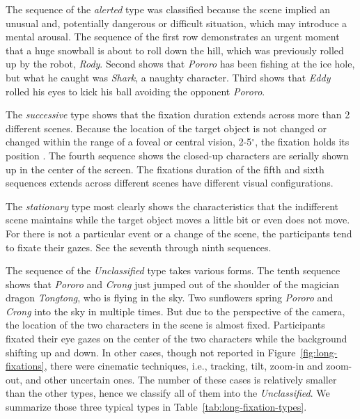 \documentclass[oneside,master]{snueethesis}
\begin{document}
The sequence of the \textit{alerted} type was classified because the scene implied an unusual and, potentially dangerous or difficult situation, which may introduce a mental arousal. The sequence of the first row demonstrates an urgent moment that a huge snowball is about to roll down the hill, which was previously rolled up by the robot, \textit{Rody}. Second shows that \textit{Pororo} has been fishing at the ice hole, but what he caught was \textit{Shark}, a naughty character. Third shows that \textit{Eddy} rolled his eyes to kick his ball avoiding the opponent \textit{Pororo}.

The \textit{successive} type shows that the fixation duration extends across more than 2 different scenes. Because the location of the target object is not changed or changed within the range of a foveal or central vision, 2-5$^{\circ}$, the fixation holds its position \cite{mcmorris2014acquisition}. The fourth sequence shows the closed-up characters are serially shown up in the center of the screen. The fixations duration of the fifth and sixth sequences extends across different scenes have different visual configurations.

The \textit{stationary} type most clearly shows the characteristics that the indifferent scene maintains while the target object moves a little bit or even does not move. For there is not a particular event or a change of the scene, the participants tend to fixate their gazes. See the seventh through ninth sequences.

The sequence of the \textit{Unclassified} type takes various forms. The tenth sequence shows that \textit{Pororo} and \textit{Crong} just jumped out of the shoulder of the magician dragon \textit{Tongtong}, who is flying in the sky. Two sunflowers spring \textit{Pororo} and \textit{Crong} into the sky in multiple times. But due to the perspective of the camera, the location of the two characters in the scene is almost fixed. Participants fixated their eye gazes on the center of the two characters while the background shifting up and down. In other cases, though not reported in Figure~\ref{fig:long-fixations}, there were cinematic techniques, i.e., tracking, tilt, zoom-in and zoom-out, and other uncertain ones. The number of these cases is relatively smaller than the other types, hence we classify all of them into the \textit{Unclassified}. We summarize those three typical types in Table~\ref{tab:long-fixation-types}.
\end{document}
